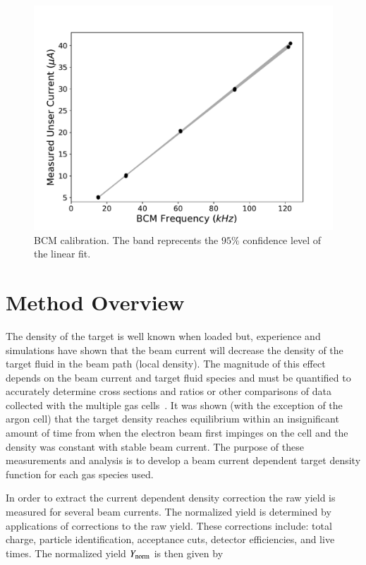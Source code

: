 \documentclass[review,numbers,sort&compress]{elsarticle}
\begin{document}
\begin{figure}[!h]
      \centering
    \includegraphics[width=\linewidth]{images/dnew_calibration.pdf}
    \caption{BCM calibration. The band reprecents the $95\%$ confidence level of the linear fit.}
    \label{fig:dnew_cal}
\end{figure}


\section{Method Overview}

The density of the target is well known when loaded but, experience and simulations have shown that the beam current will 
decrease the density of the target fluid in the beam path (local density). The magnitude of this effect depends on the 
beam current and target fluid species and must be quantified to accurately determine cross sections and ratios or 
other comparisons of data collected with the multiple gas cells~\cite{celldes}. 
It was shown (with the exception of the argon cell) that the target density reaches equilibrium within an insignificant amount of time from when the 
electron beam first impinges on the cell and the density was constant with stable beam current. The purpose of 
these measurements and analysis is to develop a beam current dependent target density function for each gas species used.  

In order to extract the current dependent density correction the raw yield is measured for several beam currents. The normalized yield is 
determined by applications of corrections  to the raw yield. These corrections include: total charge, 
particle identification, acceptance cuts, detector efficiencies, and live times. The normalized yield $Y_{\rm{norm}}$ is then given by
\end{document}

